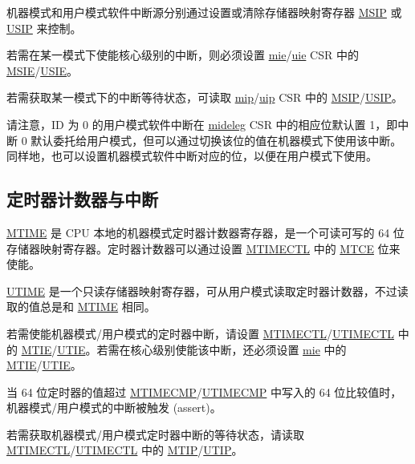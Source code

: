 \documentclass[main\_\_CN.tex]{subfiles}
\begin{document}
机器模式和用户模式软件中断源分别通过设置或清除存储器映射寄存器 \hyperref[regdesc:CLINTMSIPREG]{MSIP} 或 \hyperref[regdesc:CLINTUSIPREG]{USIP} 来控制。

若需在某一模式下使能核心级别的中断，则必须设置 \hyperref[regdesc:MIE]{mie}/\hyperref[regdesc:UIE]{uie} CSR 中的 \hyperref[fielddesc:MIEMSIE]{MSIE}/\hyperref[fielddesc:UIEUSIE]{USIE}。

若需获取某一模式下的中断等待状态，可读取 \hyperref[regdesc:MIP]{mip}/\hyperref[regdesc:UIP]{uip} CSR 中的 \hyperref[fielddesc:MIPMSIP]{MSIP}/\hyperref[fielddesc:UIPUSIP]{USIP}。

请注意，ID 为 0 的用户模式软件中断在 \hyperref[regdesc:MIDELEG]{mideleg} CSR 中的相应位默认置 1，即中断 0 默认委托给用户模式，但可以通过切换该位的值在机器模式下使用该中断。同样地，也可以设置机器模式软件中断对应的位，以便在用户模式下使用。

\subsection{定时器计数器与中断}
\label{sec:riscvcpu-clint-timer}

\hyperref[regdesc:CLINTMTIMEREG]{MTIME} 是 CPU 本地的机器模式定时器计数器寄存器，是一个可读可写的 64 位存储器映射寄存器。定时器计数器可以通过设置 \hyperref[regdesc:CLINTMTIMECTLREG]{MTIMECTL} 中的 \hyperref[fielddesc:CLINTMTIMECTLMTCE]{MTCE} 位来使能。

\hyperref[regdesc:CLINTUTIMEREG]{UTIME} 是一个只读存储器映射寄存器，可从用户模式读取定时器计数器，不过读取的值总是和 \hyperref[regdesc:CLINTMTIMEREG]{MTIME} 相同。

若需使能机器模式/用户模式的定时器中断，请设置 \hyperref[regdesc:CLINTMTIMECTLREG]{MTIMECTL}/\hyperref[regdesc:CLINTUTIMECTLREG]{UTIMECTL} 中的 \hyperref[fielddesc:CLINTMTIMECTLMTIE]{MTIE}/\hyperref[fielddesc:CLINTUTIMECTLUTIE]{UTIE}。若需在核心级别使能该中断，还必须设置 \hyperref[regdesc:MIE]{mie} 中的 \hyperref[fielddesc:MIEMTIE]{MTIE}/\hyperref[fielddesc:UIEUTIE]{UTIE}。

当 64 位定时器的值超过 \hyperref[regdesc:CLINTMTIMECMPREG]{MTIMECMP}/\hyperref[regdesc:CLINTUTIMECMPREG]{UTIMECMP} 中写入的 64 位比较值时，机器模式/用户模式的中断被触发 (assert)。

若需获取机器模式/用户模式定时器中断的等待状态，请读取 \hyperref[regdesc:CLINTMTIMECTLREG]{MTIMECTL}/\hyperref[regdesc:CLINTUTIMECTLREG]{UTIMECTL} 中的 \hyperref[fielddesc:CLINTMTIMECTLMTIP]{MTIP}/\hyperref[fielddesc:CLINTUTIMECTLUTIP]{UTIP}。
\end{document}
